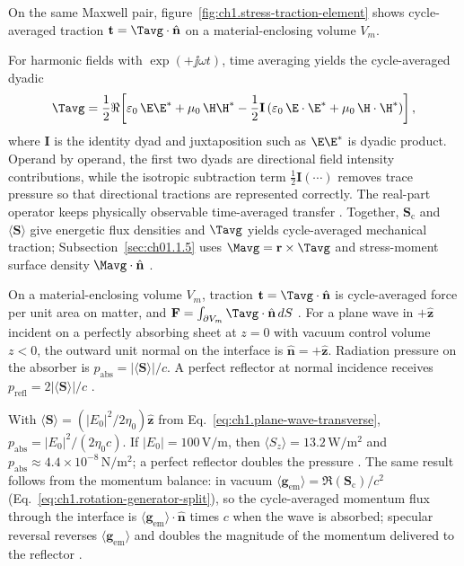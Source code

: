 On the same Maxwell pair, figure~\ref{fig:ch1.stress-traction-element} shows cycle-averaged traction $\mathbf{t}=\Tavg\cdot\hat{\mathbf{n}}$ on a material-enclosing volume $V_m$.

For harmonic fields with $\exp(+\jj\omega t)$, time averaging yields the cycle-averaged dyadic
\begin{equation}
\label{eq:ch1.maxwell-stress}
\Tavg
=\frac{1}{2}\Re\!\left[
\varepsilon_0\,\E\E^*
+\mu_0\,\H\H^*
-\frac{1}{2}\mathbf{I}
\left(\varepsilon_0\,\E\cdot\E^*+\mu_0\,\H\cdot\H^*\right)
\right],
\end{equation}
where \(\mathbf{I}\) is the identity dyad and juxtaposition such as \(\E\E^*\)
is dyadic product. Operand by operand, the first two dyads are directional field
intensity contributions, while the isotropic subtraction term
\(\tfrac{1}{2}\mathbf{I}(\cdots)\) removes trace pressure so that directional
tractions are represented correctly. The real-part operator keeps physically
observable time-averaged transfer \cite{stratton1941}.
Together, $\mathbf{S}_\mathrm{c}$ and $\langle\mathbf{S}\rangle$ give energetic flux densities and $\Tavg$ yields cycle-averaged mechanical traction; Subsection~\ref{sec:ch01.1.5} uses $\Mavg=\mathbf{r}\times\Tavg$ and stress-moment surface density $\Mavg\cdot\hat{\mathbf{n}}$ \cite{poynting1884}.

On a material-enclosing volume $V_m$, traction $\mathbf{t}=\Tavg\cdot\hat{\mathbf{n}}$ is cycle-averaged force per unit area on matter, and $\mathbf{F}=\int_{\partial V_m}\Tavg\cdot\hat{\mathbf{n}}\,dS$ \cite{stratton1941}.
For a plane wave in $+\hat{\mathbf{z}}$ incident on a perfectly absorbing sheet at
$z=0$ with vacuum control volume $z<0$, the outward unit normal on the interface is
$\hat{\mathbf{n}}=+\hat{\mathbf{z}}$. Radiation pressure on the absorber is
$p_{\mathrm{abs}}=|\langle\mathbf{S}\rangle|/c$. A perfect reflector at normal incidence receives
$p_{\mathrm{refl}}=2|\langle\mathbf{S}\rangle|/c$ \cite{stratton1941,maxwell1873}.

\begin{example}
\label{ex:ch1.radiation-pressure}
With $\langle\mathbf{S}\rangle=(|E_0|^2/2\eta_0)\hat{\mathbf{z}}$ from Eq.~\eqref{eq:ch1.plane-wave-transverse}, $p_{\mathrm{abs}}=|E_0|^2/(2\eta_0 c)$. If $|E_0|=100\,\mathrm{V/m}$, then $\langle S_z\rangle=13.2\,\mathrm{W/m^2}$ and $p_{\mathrm{abs}}\approx4.4\times10^{-8}\,\mathrm{N/m^2}$; a perfect reflector doubles the pressure \cite{stratton1941}. The same result follows from the momentum balance: in vacuum $\langle\mathbf{g}_{\mathrm{em}}\rangle=\Re(\mathbf{S}_\mathrm{c})/c^2$ (Eq.~\eqref{eq:ch1.rotation-generator-split}), so the cycle-averaged momentum flux through the interface is $\langle\mathbf{g}_{\mathrm{em}}\rangle\cdot\hat{\mathbf{n}}$ times $c$ when the wave is absorbed; specular reversal reverses $\langle\mathbf{g}_{\mathrm{em}}\rangle$ and doubles the magnitude of the momentum delivered to the reflector \cite{stratton1941}.
\end{example}

